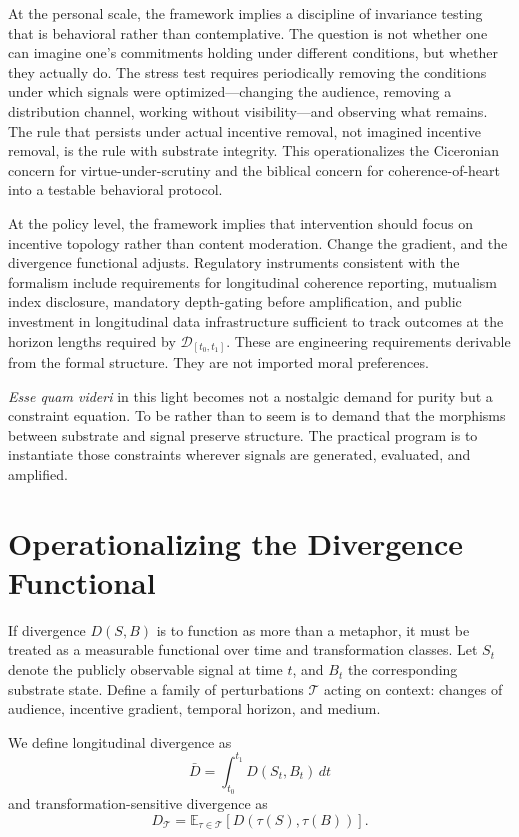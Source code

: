 \documentclass[11pt]{article}
\begin{document}
At the personal scale, the framework implies a discipline of invariance testing that is behavioral rather than contemplative. The question is not whether one can imagine one's commitments holding under different conditions, but whether they actually do. The stress test requires periodically removing the conditions under which signals were optimized---changing the audience, removing a distribution channel, working without visibility---and observing what remains. The rule that persists under actual incentive removal, not imagined incentive removal, is the rule with substrate integrity. This operationalizes the Ciceronian concern for virtue-under-scrutiny and the biblical concern for coherence-of-heart into a testable behavioral protocol.

At the policy level, the framework implies that intervention should focus on incentive topology rather than content moderation. Change the gradient, and the divergence functional adjusts. Regulatory instruments consistent with the formalism include requirements for longitudinal coherence reporting, mutualism index disclosure, mandatory depth-gating before amplification, and public investment in longitudinal data infrastructure sufficient to track outcomes at the horizon lengths required by $\mathcal{D}_{[t_0,t_1]}$. These are engineering requirements derivable from the formal structure. They are not imported moral preferences.

\textit{Esse quam videri} in this light becomes not a nostalgic demand for purity but a constraint equation. To be rather than to seem is to demand that the morphisms between substrate and signal preserve structure. The practical program is to instantiate those constraints wherever signals are generated, evaluated, and amplified.

\section{Operationalizing the Divergence Functional}

If divergence $D(S,B)$ is to function as more than a metaphor, it must be treated as a measurable functional over time and transformation classes. Let $S_t$ denote the publicly observable signal at time $t$, and $B_t$ the corresponding substrate state. Define a family of perturbations $\mathcal{T}$ acting on context: changes of audience, incentive gradient, temporal horizon, and medium.

We define longitudinal divergence as
\[
\bar{D} = \int_{t_0}^{t_1} D\!\left(S_t, B_t\right)\, dt
\]
and transformation-sensitive divergence as
\[
D_{\mathcal{T}} = \mathbb{E}_{\tau \in \mathcal{T}}\left[D\!\left(\tau(S), \tau(B)\right)\right].
\]
\end{document}
